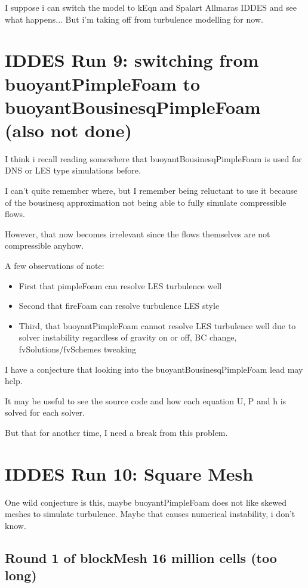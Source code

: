 \documentclass[12pt]{article}
\renewcommand{\_}{\kern-1.5pt\textunderscore\kern-1.5pt}
\begin{document}
I suppose i can switch the model to kEqn and Spalart Allmaras IDDES and see what happens... But i'm taking off from turbulence modelling for now. 

\section{IDDES Run 9: switching from buoyantPimpleFoam to buoyantBousinesqPimpleFoam (also not done)}


I think i recall reading somewhere that buoyantBousinesqPimpleFoam is used for DNS or LES type simulations before. 


I can't quite remember where, but I remember being reluctant to use it because of the bousinesq approximation not being able to fully simulate compressible flows.


However, that now becomes irrelevant since the flows themselves are not compressible anyhow.


A few observations of note:


\begin{itemize}
	\item First that pimpleFoam can resolve LES turbulence well
	\item Second that fireFoam can resolve turbulence LES style
	\item Third, that buoyantPimpleFoam cannot resolve LES turbulence well due to solver instability regardless of gravity on or off, BC change, fvSolutions/fvSchemes tweaking
	
\end{itemize}


I have a conjecture that looking into the buoyantBousinesqPimpleFoam lead may help.


It may be useful to see the source code and how each equation U, P and h is solved for each solver.


But that for another time, I need a break from this problem. 


\section{IDDES Run 10: Square Mesh}

One wild conjecture is this, maybe buoyantPimpleFoam does not like skewed meshes to simulate turbulence. Maybe that causes numerical instability, i don't know. 

\subsection{Round 1 of blockMesh 16 million cells (too long)}
\end{document}
